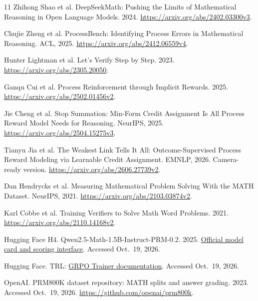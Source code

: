 \documentclass{article}
\begin{document}
\begin{thebibliography}{11}
Zhihong Shao et al. DeepSeekMath: Pushing the Limits of Mathematical Reasoning in Open Language Models. 2024.
\url{https://arxiv.org/abs/2402.03300v3}.

Chujie Zheng et al. ProcessBench: Identifying Process Errors in Mathematical Reasoning. ACL, 2025.
\url{https://arxiv.org/abs/2412.06559v4}.

Hunter Lightman et al. Let's Verify Step by Step. 2023.
\url{https://arxiv.org/abs/2305.20050}.

Ganqu Cui et al. Process Reinforcement through Implicit Rewards. 2025.
\url{https://arxiv.org/abs/2502.01456v2}.

Jie Cheng et al. Stop Summation: Min-Form Credit Assignment Is All Process Reward Model Needs for Reasoning. NeurIPS, 2025.
\url{https://arxiv.org/abs/2504.15275v3}.

Tianyu Jia et al. The Weakest Link Tells It All: Outcome-Supervised Process Reward Modeling via Learnable Credit Assignment. EMNLP, 2026. Camera-ready version.
\url{https://arxiv.org/abs/2606.27739v2}.

Dan Hendrycks et al. Measuring Mathematical Problem Solving With the MATH Dataset. NeurIPS, 2021.
\url{https://arxiv.org/abs/2103.03874v2}.

Karl Cobbe et al. Training Verifiers to Solve Math Word Problems. 2021.
\url{https://arxiv.org/abs/2110.14168v2}.

Hugging Face H4. Qwen2.5-Math-1.5B-Instruct-PRM-0.2. 2025.
\href{https://huggingface.co/HuggingFaceH4/Qwen2.5-Math-1.5B-Instruct-PRM-0.2}{Official model card and scoring interface}. Accessed Oct.\ 19, 2026.

Hugging Face. TRL: \href{https://huggingface.co/docs/trl/grpo_trainer}{GRPO Trainer documentation}. Accessed Oct.\ 19, 2026.

OpenAI. PRM800K dataset repository: MATH splits and answer grading. 2023. Accessed Oct.\ 19, 2026.
\url{https://github.com/openai/prm800k}.
\end{thebibliography}
\end{document}
